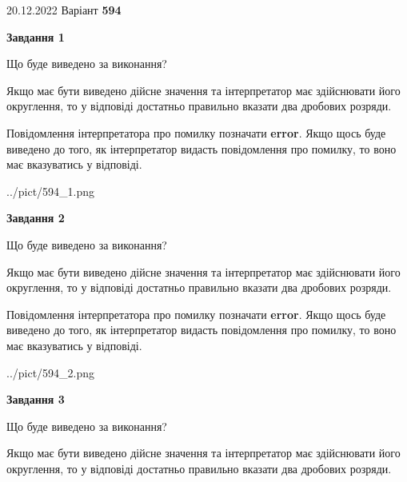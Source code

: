 \documentclass[12pt, ukrainian]{article}
\begin{document}
{20.12.2022 Варіант \No \textbf { 594 }\par}
{
\begin {Large}

{\begin {center}\textbf{Завдання 1}\end {center}}\par
Що буде виведено за виконання? \par

Якщо має бути виведено дійсне значення та інтерпретатор має здійснювати його округлення, 
то у відповіді достатньо правильно вказати два дробових розряди.

Повідомлення інтерпретатора про помилку позначати \textbf{error}.
Якщо щось буде виведено до того, як інтерпретатор видасть повідомлення про помилку, 
то воно має вказуватись у відповіді. \par

\begin{center}
	{../pict/594_1.png}
\end{center}
\newpage

{\begin {center}\textbf{Завдання 2}\end {center}}\par
Що буде виведено за виконання? \par

Якщо має бути виведено дійсне значення та інтерпретатор має здійснювати його округлення, 
то у відповіді достатньо правильно вказати два дробових розряди.

Повідомлення інтерпретатора про помилку позначати \textbf{error}.
Якщо щось буде виведено до того, як інтерпретатор видасть повідомлення про помилку, 
то воно має вказуватись у відповіді. \par

\begin{center}
	{../pict/594_2.png}
\end{center}
\newpage

{\begin {center}\textbf{Завдання 3}\end {center}}\par
Що буде виведено за виконання? \par

Якщо має бути виведено дійсне значення та інтерпретатор має здійснювати його округлення, 
то у відповіді достатньо правильно вказати два дробових розряди.


\end{Large}}
\end{document}
